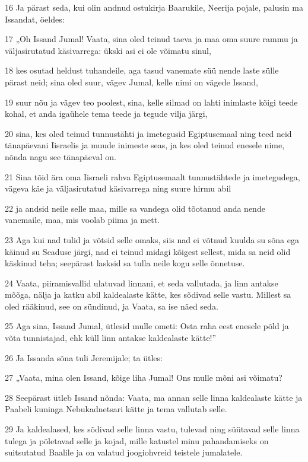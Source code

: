\par 16 Ja pärast seda, kui olin andnud ostukirja Baarukile, Neerija pojale, palusin ma Issandat, öeldes:
\par 17 „Oh Issand Jumal! Vaata, sina oled teinud taeva ja maa oma suure rammu ja väljasirutatud käsivarrega: ükski asi ei ole võimatu sinul,
\par 18 kes osutad heldust tuhandeile, aga tasud vanemate süü nende laste sülle pärast neid; sina oled suur, vägev Jumal, kelle nimi on vägede Issand,
\par 19 suur nõu ja vägev teo poolest, sina, kelle silmad on lahti inimlaste kõigi teede kohal, et anda igaühele tema teede ja tegude vilja järgi,
\par 20 sina, kes oled teinud tunnustähti ja imetegusid Egiptusemaal ning teed neid tänapäevani Iisraelis ja muude inimeste seas, ja kes oled teinud enesele nime, nõnda nagu see tänapäeval on.
\par 21 Sina tõid ära oma Iisraeli rahva Egiptusemaalt tunnustähtede ja imetegudega, vägeva käe ja väljasirutatud käsivarrega ning suure hirmu abil
\par 22 ja andsid neile selle maa, mille sa vandega olid tõotanud anda nende vanemaile, maa, mis voolab piima ja mett.
\par 23 Aga kui nad tulid ja võtsid selle omaks, siis nad ei võtnud kuulda su sõna ega käinud su Seaduse järgi, nad ei teinud midagi kõigest sellest, mida sa neid olid käskinud teha; seepärast lasksid sa tulla neile kogu selle õnnetuse.
\par 24 Vaata, piiramisvallid ulatuvad linnani, et seda vallutada, ja linn antakse mõõga, nälja ja katku abil kaldealaste kätte, kes sõdivad selle vastu. Millest sa oled rääkinud, see on sündinud, ja Vaata, sa ise näed seda.
\par 25 Aga sina, Issand Jumal, ütlesid mulle ometi: Osta raha eest enesele põld ja võta tunnistajad, ehk küll linn antakse kaldealaste kätte!”
\par 26 Ja Issanda sõna tuli Jeremijale; ta ütles:
\par 27 „Vaata, mina olen Issand, kõige liha Jumal! Ons mulle mõni asi võimatu?
\par 28 Seepärast ütleb Issand nõnda: Vaata, ma annan selle linna kaldealaste kätte ja Paabeli kuninga Nebukadnetsari kätte ja tema vallutab selle.
\par 29 Ja kaldealased, kes sõdivad selle linna vastu, tulevad ning süütavad selle linna tulega ja põletavad selle ja kojad, mille katustel minu pahandamiseks on suitsutatud Baalile ja on valatud joogiohvreid teistele jumalatele.
